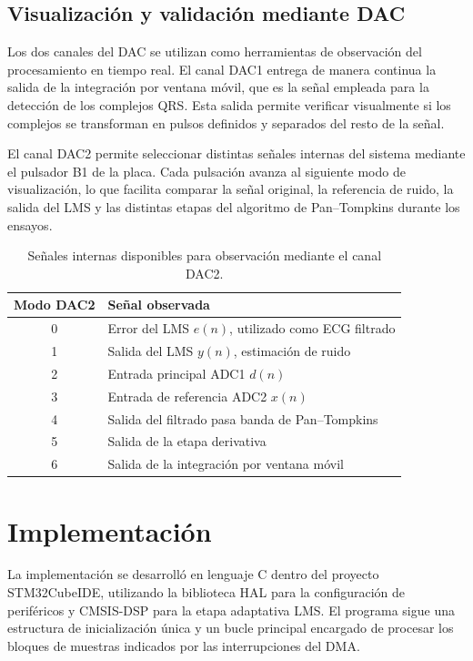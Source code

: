 \documentclass[12pt]{article}
\begin{document}
		\subsection{Visualización y validación mediante DAC}

		Los dos canales del DAC se utilizan como herramientas de observación del procesamiento en tiempo real. El canal DAC1 entrega de manera continua la salida de la integración por ventana móvil, que es la señal empleada para la detección de los complejos QRS. Esta salida permite verificar visualmente si los complejos se transforman en pulsos definidos y separados del resto de la señal.

		El canal DAC2 permite seleccionar distintas señales internas del sistema mediante el pulsador B1 de la placa. Cada pulsación avanza al siguiente modo de visualización, lo que facilita comparar la señal original, la referencia de ruido, la salida del LMS y las distintas etapas del algoritmo de Pan--Tompkins durante los ensayos.

		\begin{table}[H]
			\centering
			\begin{tabular}{|c|l|}
				\hline
				Modo DAC2 & Señal observada \\
				\hline
				0 & Error del LMS $e(n)$, utilizado como ECG filtrado \\
				1 & Salida del LMS $y(n)$, estimación de ruido \\
				2 & Entrada principal ADC1 $d(n)$ \\
				3 & Entrada de referencia ADC2 $x(n)$ \\
				4 & Salida del filtrado pasa banda de Pan--Tompkins \\
				5 & Salida de la etapa derivativa \\
				6 & Salida de la integración por ventana móvil \\
				\hline
			\end{tabular}
			\caption{Señales internas disponibles para observación mediante el canal DAC2.}
			\label{tab:dac2_modos}
		\end{table}

	\section{Implementación}

		La implementación se desarrolló en lenguaje C dentro del proyecto STM32CubeIDE, utilizando la biblioteca HAL para la configuración de periféricos y CMSIS-DSP para la etapa adaptativa LMS. El programa sigue una estructura de inicialización única y un bucle principal encargado de procesar los bloques de muestras indicados por las interrupciones del DMA.
\end{document}
